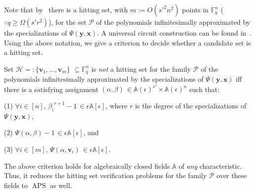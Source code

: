 \documentclass{toc}
\newcommand{\F}{\mathbb{F}}
\newcommand{\calH}{\mathcal{H}}
\newcommand{\calP}{\mathcal{P}}
\newcommand{\aff}{\mathbb{A}}
\DeclareMathOperator{\APS}{\mathrm{APS}\xspace} %
\begin{document}
Note that by~\cite{heintz1980testing} there is a hitting set, with $m:=O(s'^2n^2)$ points in $\F_q^n$ ($\because q\ge\Omega(s'r^2)$), 
%
for the set $\calP$ of the polynomials %
infinitesimally approximated by the specializations of $\Psi(\mathbf{y},\mathbf{x})$.
A universal circuit construction can be found in~\cite{raz2008elusive, shpilka2010arithmetic}. 
Using the above notation, we give a criterion to decide whether a candidate set is a hitting set. 

\begin{theorem}\label{thm_HITTING}
Set $\calH=:\{\mathbf v_1,\ldots, \mathbf v_m\}$ $\subseteq \F_q^n$ is \emph{not} a hitting set 
%
for the family $\calP$ of the polynomials %
infinitesimally approximated by the specializations of $\Psi(\mathbf{y},\mathbf{x})$ iff there is a satisfying assignment $(\alpha, \beta)\,\in \aff(\epsilon)^{s'}\times \aff(\epsilon)^{n}$ such that:

\smallskip\noindent
(1) $\forall i \in [n],\, {\beta_i}^{r+1}- 1 \,\in \epsilon\aff[\epsilon]$, where $r$ is the degree of the  specializations of $\Psi(\mathbf{y},\mathbf{x})$,  

\noindent 
(2) $\Psi(\alpha, \beta) - 1 \,\in \epsilon\aff[\epsilon]$, and

\noindent
(3) $\forall i \in [m],\, \Psi(\alpha,\mathbf{v}_i) \,\in \epsilon\aff[\epsilon]$.
\end{theorem}

%
\begin{remark}   %
The above criterion holds for algebraically closed fields $\aff$ of \emph{any} characteristic. Thus, it reduces 
%
the hitting set verification problems for the family $\calP$ over these fields %
to $\APS$ as well.
\end{remark}
\end{document}
